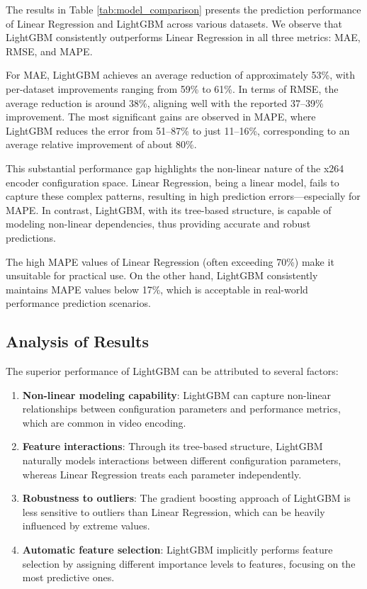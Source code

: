\documentclass[10pt]{article}
\begin{document}
The results in Table \ref{tab:model_comparison} presents the prediction performance of Linear Regression and LightGBM across various datasets. We observe that LightGBM consistently outperforms Linear Regression in all three metrics: MAE, RMSE, and MAPE.

For MAE, LightGBM achieves an average reduction of approximately 53\%, with per-dataset improvements ranging from 59\% to 61\%. In terms of RMSE, the average reduction is around 38\%, aligning well with the reported 37--39\% improvement. The most significant gains are observed in MAPE, where LightGBM reduces the error from 51--87\% to just 11--16\%, corresponding to an average relative improvement of about 80\%.

This substantial performance gap highlights the non-linear nature of the x264 encoder configuration space. Linear Regression, being a linear model, fails to capture these complex patterns, resulting in high prediction errors—especially for MAPE. In contrast, LightGBM, with its tree-based structure, is capable of modeling non-linear dependencies, thus providing accurate and robust predictions.

The high MAPE values of Linear Regression (often exceeding 70\%) make it unsuitable for practical use. On the other hand, LightGBM consistently maintains MAPE values below 17\%, which is acceptable in real-world performance prediction scenarios.

\subsection{Analysis of Results}
The superior performance of LightGBM can be attributed to several factors:

\begin{enumerate}
    \item \textbf{Non-linear modeling capability}: LightGBM can capture non-linear relationships between configuration parameters and performance metrics, which are common in video encoding.
    
    \item \textbf{Feature interactions}: Through its tree-based structure, LightGBM naturally models interactions between different configuration parameters, whereas Linear Regression treats each parameter independently.
    
    \item \textbf{Robustness to outliers}: The gradient boosting approach of LightGBM is less sensitive to outliers than Linear Regression, which can be heavily influenced by extreme values.
    
    \item \textbf{Automatic feature selection}: LightGBM implicitly performs feature selection by assigning different importance levels to features, focusing on the most predictive ones.
\end{enumerate}
\end{document}
